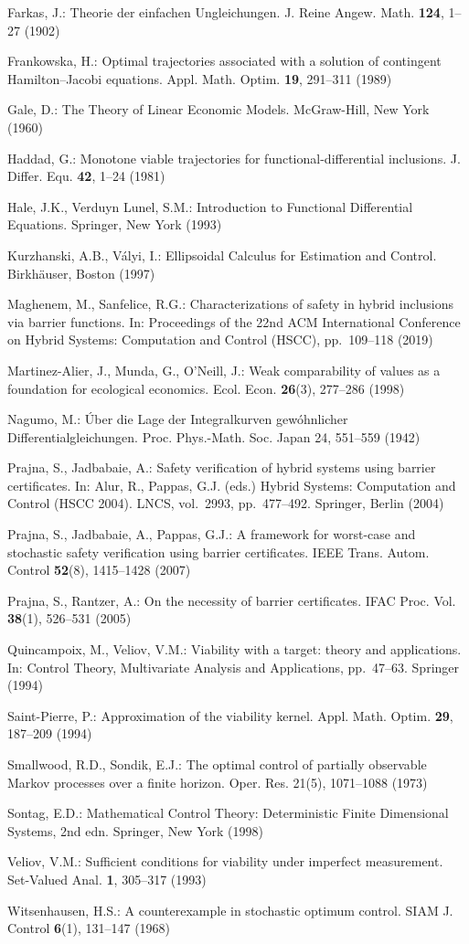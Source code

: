 \documentclass[10pt,twocolumn]{article}
\theoremstyle{definition}
\begin{document}
{Farkas, J.: Theorie der einfachen Ungleichungen. J. Reine Angew. Math.
\textbf{124}, 1--27 (1902)

Frankowska, H.: Optimal trajectories associated with a solution of
contingent Hamilton--Jacobi equations. Appl. Math. Optim. \textbf{19},
291--311 (1989)

Gale, D.: The Theory of Linear Economic Models. McGraw-Hill, New York
(1960)

Haddad, G.: Monotone viable trajectories for functional-differential
inclusions. J. Differ. Equ. \textbf{42}, 1--24 (1981)

Hale, J.K., Verduyn Lunel, S.M.: Introduction to Functional Differential
Equations. Springer, New York (1993)

Kurzhanski, A.B., V\'alyi, I.: Ellipsoidal Calculus for Estimation and
Control. Birkh\"auser, Boston (1997)

Maghenem, M., Sanfelice, R.G.: Characterizations of safety in hybrid
inclusions via barrier functions. In: Proceedings of the 22nd ACM
International Conference on Hybrid Systems: Computation and Control
(HSCC), pp.~109--118 (2019)

Martinez-Alier, J., Munda, G., O'Neill, J.: Weak comparability of values
as a foundation for ecological economics. Ecol. Econ. \textbf{26}(3),
277--286 (1998)

Nagumo, M.: \'Uber die Lage der Integralkurven gew\'ohnlicher
Differentialgleichungen. Proc. Phys.-Math. Soc. Japan 24, 551--559
(1942)

Prajna, S., Jadbabaie, A.: Safety verification of hybrid systems using
barrier certificates. In: Alur, R., Pappas, G.J. (eds.) Hybrid Systems:
Computation and Control (HSCC 2004). LNCS, vol.~2993, pp.~477--492.
Springer, Berlin (2004)

Prajna, S., Jadbabaie, A., Pappas, G.J.: A framework for worst-case and
stochastic safety verification using barrier certificates. IEEE Trans.
Autom. Control \textbf{52}(8), 1415--1428 (2007)

Prajna, S., Rantzer, A.: On the necessity of barrier certificates. IFAC
Proc. Vol. \textbf{38}(1), 526--531 (2005)

Quincampoix, M., Veliov, V.M.: Viability with a target: theory and
applications. In: Control Theory, Multivariate Analysis and
Applications, pp.~47--63. Springer (1994)

Saint-Pierre, P.: Approximation of the viability kernel. Appl. Math.
Optim. \textbf{29}, 187--209 (1994)

Smallwood, R.D., Sondik, E.J.: The optimal control of partially
observable Markov processes over a finite horizon. Oper. Res. 21(5),
1071--1088 (1973)

Sontag, E.D.: Mathematical Control Theory: Deterministic Finite Dimensional Systems, 2nd edn. Springer, New York (1998)

Veliov, V.M.: Sufficient conditions for viability under imperfect
measurement. Set-Valued Anal. \textbf{1}, 305--317 (1993)

Witsenhausen, H.S.: A counterexample in stochastic optimum control.
SIAM J. Control \textbf{6}(1), 131--147 (1968)

}
\end{document}
